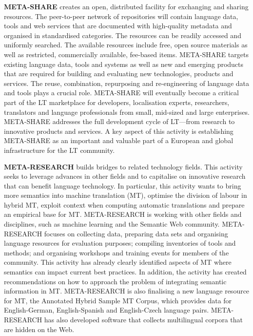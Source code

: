 \documentclass[]{../../metanetpaper}
\begin{document}
\begin{Parallel}[c]{77mm}{77mm}
{\textbf{META-SHARE} creates an open, distributed facility for
exchanging and sharing resources. The peer-to-peer network of
repositories will contain language data, tools and web services that
are documented with high-quality metadata and organised in
standardised categories. The resources can be readily accessed and
uniformly searched. The available resources include free, open source
materials as well as restricted, commercially available, fee-based
items. META-SHARE targets existing language data, tools and systems as
well as new and emerging products that are required for building and
evaluating new technologies, products and services. The reuse,
combination, repurposing and re-engineering of language data and tools
plays a crucial role. META-SHARE will eventually become a critical
part of the LT marketplace for developers, localisation experts,
researchers, translators and language professionals from small,
mid-sized and large enterprises. META-SHARE addresses the full
development cycle of LT—from research to innovative products and
services. A key aspect of this activity is establishing META-SHARE as
an important and valuable part of a European and global infrastructure
for the LT community.

\textbf{META-RESEARCH} builds bridges to related technology
fields. This activity seeks to leverage advances in other fields and
to capitalise on innovative research that can benefit language
technology. In particular, this activity wants to bring more semantics
into machine translation (MT), optimise the division of labour in
hybrid MT, exploit context when computing automatic translations and
prepare an empirical base for MT. META-RESEARCH is working with other
fields and disciplines, such as machine learning and the Semantic Web
community.  META-RESEARCH focuses on collecting data, preparing data
sets and organising language resources for evaluation purposes;
compiling inventories of tools and methods; and organising workshops
and training events for members of the community. This activity has
already clearly identified aspects of MT where semantics can impact
current best practices. In addition, the activity has created
recommendations on how to approach the problem of integrating semantic
information in MT. META-RESEARCH is also finalising a new language
resource for MT, the Annotated Hybrid Sample MT Corpus, which provides
data for English-German, English-Spanish and English-Czech language
pairs. META-RESEARCH has also developed software that collects
multilingual corpora that are hidden on the Web.
}


\end{Parallel}
\end{document}
